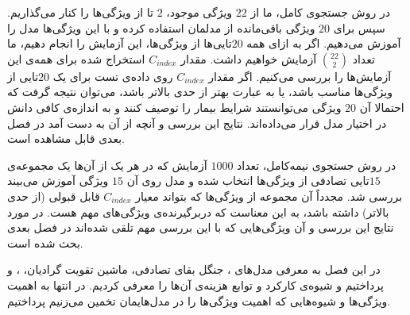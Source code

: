 در روش جستجوی کامل، ما از $22$ ویژگی موجود، $2$ تا از ویژگی‌ها را کنار می‌گذاریم. سپس برای $20$ ویژگی باقی‌مانده از مدلمان استفاده کرده و با این ویژگی‌ها مدل را آموزش می‌دهیم. اگر به ازای همه $20$تایی‌ها از ویژگی‌ها، این آزمایش را انجام دهیم، ما تعداد
$22 \choose 2$
 آزمایش خواهیم داشت. مقدار $C_{index}$ استخراج شده برای همه‌ی این آزمایش‌ها را بررسی می‌کنیم. اگر مقدار $C_{index}$ روی داده‌ی تست برای یک $20$‌تایی از ویژگی‌ها مناسب باشد، یا به عبارت بهتر از حدی بالاتر باشد، می‌توان نتیجه گرفت که احتمالا آن $20$ ویژگی می‌توانستند شرایط بیمار را توصیف کنند و به اندازه‌ی کافی دانش در اختیار مدل قرار می‌داده‌اند. نتایج این بررسی و آنچه از آن به دست آمد در فصل بعدی قابل مشاهده است.

در روش جستجوی نیمه‌کامل، تعداد $1000$ آزمایش که در هر یک از آن‌ها یک مجموعه‌ی $15$‌تایی تصادفی از ویژگی‌ها انتخاب شده و مدل  روی آن $15$ ویژگی آموزش می‌بیند بررسی شد. مجدداً آن مجموعه از ویژگی‌ها که بتواند معیار $C_{index}$ قابل قبولی (از حدی بالاتر) داشته باشد، به این معناست که دربرگیرنده‌ی ویژگی‌های مهم هست. در مورد نتایج این بررسی و آن ویژگی‌هایی که با این بررسی مهم تلقی شده‌اند در فصل بعدی بحث شده است.

در این فصل به معرفی مدل‌های ، جنگل بقای تصادفی، ماشین تقویت گرادیان، ،  و  پرداختیم و شیوه‌ی کارکرد و توابع هزینه‌ی آن‌ها را معرفی کردیم. در انتها به اهمیت ویژگی‌ها و شیوه‌هایی که اهمیت ویژگی‌ها را در مدل‌هایمان تخمین می‌زنیم پرداختیم.




